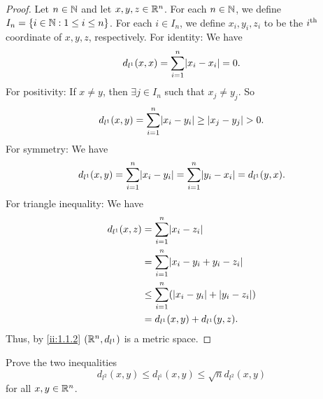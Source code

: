 \begin{proof}
  Let \(n \in \mathbb{N}\) and let \(x, y, z \in \mathbb{R}^n\).
  For each \(n \in \mathbb{N}\), we define \(I_n = \left\lbrace i \in \mathbb{N} : 1 \leq i \leq n\right\rbrace\).
  For each \(i \in I_n\), we define \(x_i, y_i, z_i\) to be the \(i^{\operatorname{th}}\) coordinate of \(x, y, z\), respectively.
  For identity:
  We have
  \[
    d_{l^1}(x, x) = \sum_{i = 1}^n \abs{x_i - x_i} = 0.
  \]
  For positivity:
  If \(x \neq y\), then \(\exists j \in I_n\) such that \(x_j \neq y_j\).
  So
  \[
    d_{l^1}(x, y) = \sum_{i = 1}^n \abs{x_i - y_i} \geq \abs{x_j - y_j} > 0.
  \]
  For symmetry:
  We have
  \[
    d_{l^1}(x, y) = \sum_{i = 1}^n \abs{x_i - y_i} = \sum_{i = 1}^n \abs{y_i - x_i} = d_{l^1}(y, x).
  \]
  For triangle inequality:
  We have
  \begin{align*}
    d_{l^1}(x, z) & = \sum_{i = 1}^n \abs{x_i - z_i}                        \\
                  & = \sum_{i = 1}^n \abs{x_i - y_i + y_i - z_i}            \\
                  & \leq \sum_{i = 1}^n (\abs{x_i - y_i} + \abs{y_i - z_i}) \\
                  & = d_{l^1}(x, y) + d_{l^1}(y, z).
  \end{align*}
  Thus, by \cref{ii:1.1.2} \((\mathbb{R}^n, d_{l^1})\) is a metric space.
\end{proof}

\begin{ex}\label{ii:ex:1.1.8}
  Prove the two inequalities
  \[
    d_{l^2}(x, y) \leq d_{l^1}(x, y) \leq \sqrt{n} d_{l^2}(x, y)
  \]
  for all \(x, y \in \mathbb{R}^n\).
\end{ex}

